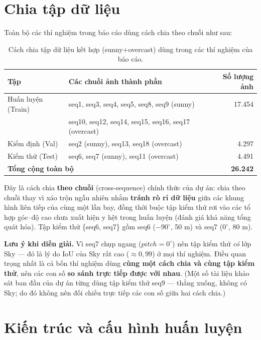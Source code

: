 \section{Chia tập dữ liệu}
\label{sec:split}

Toàn bộ các thí nghiệm trong báo cáo dùng cách chia theo chuỗi như sau:

\begin{table}[H]
\centering
\caption{Cách chia tập dữ liệu kết hợp (sunny+overcast) dùng trong các thí nghiệm của báo cáo.}
\label{tab:split}
\small
\begin{tabular}{l l r}
\toprule
\textbf{Tập} & \textbf{Các chuỗi ảnh thành phần} & \textbf{Số lượng ảnh} \\
\midrule
Huấn luyện (Train) & seq1, seq3, seq4, seq5, seq8, seq9 (sunny) & 17.454 \\
                   & seq10, seq12, seq14, seq15, seq16, seq17 (overcast) & \\
\midrule
Kiểm định (Val)    & seq2 (sunny), seq13, seq18 (overcast) & 4.297 \\
\midrule
Kiểm thử (Test)    & seq6, seq7 (sunny), seq11 (overcast) & 4.491 \\
\midrule
\multicolumn{2}{l}{\textbf{Tổng cộng toàn bộ}} & \textbf{26.242} \\
\bottomrule
\end{tabular}
\end{table}

Đây là cách chia \textbf{theo chuỗi} (cross-sequence) chính thức của dự án: chia theo
chuỗi thay vì xáo trộn ngẫu nhiên nhằm \textbf{tránh rò rỉ dữ liệu} giữa các khung
hình liên tiếp của cùng một lần bay, đồng thời buộc tập kiểm thử rơi vào các tổ hợp
góc--độ cao chưa xuất hiện y hệt trong huấn luyện (đánh giá khả năng tổng quát hóa).
Tập kiểm thử \{seq6, seq7\} gồm seq6 ($-90^\circ$, 50 m) và seq7 ($0^\circ$, 80 m).

\noindent\textbf{Lưu ý khi diễn giải.} Vì seq7 chụp ngang ($pitch = 0^\circ$) nên
tập kiểm thử \emph{có} lớp Sky --- đó là lý do IoU của Sky rất cao ($\approx 0{,}99$)
ở mọi thí nghiệm. Điều quan trọng nhất là cả bốn thí nghiệm dùng \textbf{cùng một
cách chia và cùng tập kiểm thử}, nên các con số \textbf{so sánh trực tiếp được với
nhau}. (Một số tài liệu khảo sát ban đầu của dự án từng dùng tập kiểm thử seq9 ---
thẳng xuống, không có Sky; do đó không nên đối chiếu trực tiếp các con số giữa hai
cách chia.)

\section{Kiến trúc và cấu hình huấn luyện}

